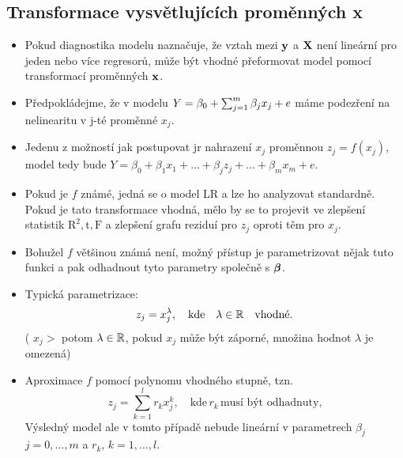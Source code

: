 \subsection{Transformace vysvětlujících proměnných x}
\begin{itemize}
\item Pokud diagnostika modelu naznačuje, že vztah mezi $ \textbf{y} $ a $ \textbf{X} $ není lineární pro jeden nebo více regresorů, může být vhodné přeformovat model pomocí transformací proměnných $ \textbf{x} $.
\item Předpokládejme, že v modelu $ Y = \beta_0 + \sum_{j=1}^{m} \beta_j x_j + e $ máme podezření na nelinearitu v j-té proměnné $ x_j $.
\item Jedenu z možností jak postupovat jr nahrazení $ x_j $ proměnnou $ z_j = f(x_j) $, model tedy bude $ Y = \beta_0 + \beta_1 x_1 + \dots + \beta_j z_j + \dots + \beta_m x_m + e $.
\item Pokud je $ f $ známé, jedná se o model LR a lze ho analyzovat standardně. \\
Pokud je tato transformace vhodná, mělo by se to projevit ve zlepšení statistik $ \text{R}^2, \text{t}, \text{F} $ a zlepšení grafu reziduí pro $ z_j $ oproti těm pro $ x_j $.
\item Bohužel $ f $ většinou známá není, možný přístup je parametrizovat nějak tuto funkci a pak odhadnout tyto parametry společně s $ \boldsymbol{\beta} $.
\end{itemize}

\begin{itemize}
\item Typická parametrizace: 
$$
  z_j = x_j^{\lambda}, \quad \text{kde} \quad \lambda \in \mathbb{R} \quad \text{vhodné}.
$$
( $ x_j > $ potom $ \lambda \in \mathbb{R} $, pokud $ x_j $ může být záporné, množina hodnot $ \lambda $ je omezená)
\item Aproximace $ f $ pomocí polynomu vhodného stupně, tzn. 
$$
  z_j = \sum_{k=1}^{l} r_k x_j^{k} , \quad \text{kde} \, r_k \, \text{musí být odhadnuty,}
$$
Výsledný model ale v tomto případě nebude lineární v parametrech $ \beta_j $ $ j = 0,\dots,m $ a $ r_k $, $ k = 1,\dots,l $.
\end{itemize}